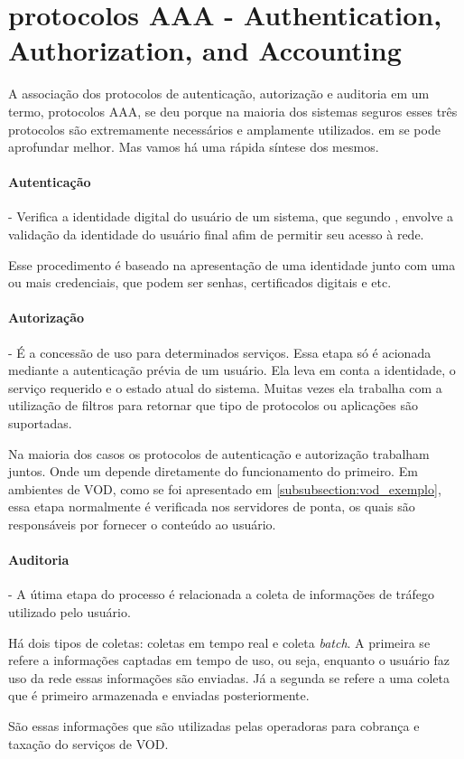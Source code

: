 \section{protocolos AAA - Authentication, Authorization, and Accounting}
\label{subsection:AAA}
A associa\c{c}\~ao dos protocolos de autentica\c{c}\~ao, autoriza\c{c}\~ao e auditoria em um termo, protocolos AAA, se deu porque na maioria dos sistemas seguros esses tr\^es protocolos s\~ao extremamente necess\'arios e amplamente utilizados. em \cite{metz1999aaa} se pode aprofundar melhor. Mas vamos h\'a uma r\'apida s\'intese dos mesmos.
\paragraph{Autentica\c{c}\~ao}- Verifica a identidade digital do usu\'ario de um sistema, que segundo \cite{metz1999aaa}, envolve a valida\c{c}\~ao da identidade do usu\'ario final afim de permitir seu acesso \`a rede.

Esse procedimento \'e baseado na apresenta\c{c}\~ao de uma identidade junto com uma ou mais credenciais, que podem ser senhas, certificados digitais e etc.
\paragraph{Autoriza\c{c}\~ao}- \'E a concess\~ao de uso para determinados servi\c{c}os. Essa etapa s\'o \'e acionada mediante a autentica\c{c}\~ao pr\'evia de um usu\'ario. Ela leva em conta a identidade, o servi\c{c}o requerido e o estado atual do sistema. Muitas vezes ela trabalha com a utiliza\c{c}\~ao de filtros para retornar que tipo de protocolos ou aplica\c{c}\~oes s\~ao suportadas.

Na maioria dos casos os protocolos de autentica\c{c}\~ao e autoriza\c{c}\~ao trabalham juntos. Onde um depende diretamente do funcionamento do primeiro. Em ambientes de VOD, como se foi apresentado em \ref{subsubsection:vod_exemplo}, essa etapa normalmente \'e verificada nos servidores de ponta, os quais s\~ao respons\'aveis por fornecer o conte\'udo ao usu\'ario.
\paragraph{Auditoria}- A \'utima etapa do processo \'e relacionada a coleta de informa\c{c}\~oes de tr\'afego utilizado pelo usu\'ario. 

H\'a dois tipos de coletas: coletas em tempo real e coleta \textit{batch}. A primeira se refere a informa\c{c}\~oes captadas em tempo de uso, ou seja, enquanto o usu\'ario faz uso da rede essas informa\c{c}\~oes s\~ao enviadas. J\'a a segunda se refere a uma coleta que \'e primeiro armazenada e enviadas posteriormente. 

S\~ao essas informa\c{c}\~oes que s\~ao utilizadas pelas operadoras para cobran\c{c}a e taxa\c{c}\~ao do servi\c{c}os de VOD.